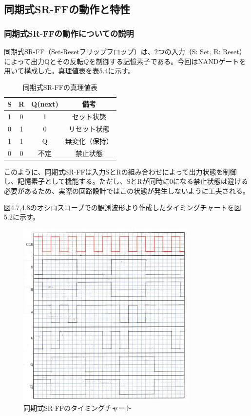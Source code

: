 \documentclass{jlreq}
\numberwithin{equation}{section}
\begin{document}
\subsection{同期式SR-FFの動作と特性}
\subsubsection{同期式SR-FFの動作についての説明}
同期式SR-FF（Set-Resetフリップフロップ）は、2つの入力（S: Set, R: Reset）によって出力Qとその反転$\overline{Q}$を制御する記憶素子である。今回はNANDゲートを用いて構成した。真理値表を表5.4に示す。

\begin{table}[H]
  \centering
  \caption{同期式SR-FFの真理値表}
  \begin{tabular}{|c|c|c|c|}
    \hline
    S & R & Q(next) & 備考 \\ \hline
    1 & 0 & 1 & セット状態 \\ \hline
    0 & 1 & 0 & リセット状態 \\ \hline
    1 & 1 & Q & 無変化（保持） \\ \hline
    0 & 0 & 不定 & 禁止状態 \\ \hline
  \end{tabular}
\end{table}

このように、同期式SR-FFは入力SとRの組み合わせによって出力状態を制御し、記憶素子として機能する。ただし、SとRが同時に0になる禁止状態は避ける必要があるため、実際の回路設計ではこの状態が発生しないように工夫される。

図4.7,4.8のオシロスコープでの観測波形より作成したタイミングチャートを図5.2に示す。

\begin{figure}[H]
  \centering
  \includegraphics[width=0.8\textwidth]{assets/srffchart.png}
  \caption{同期式SR-FFのタイミングチャート}
\end{figure}
\end{document}
